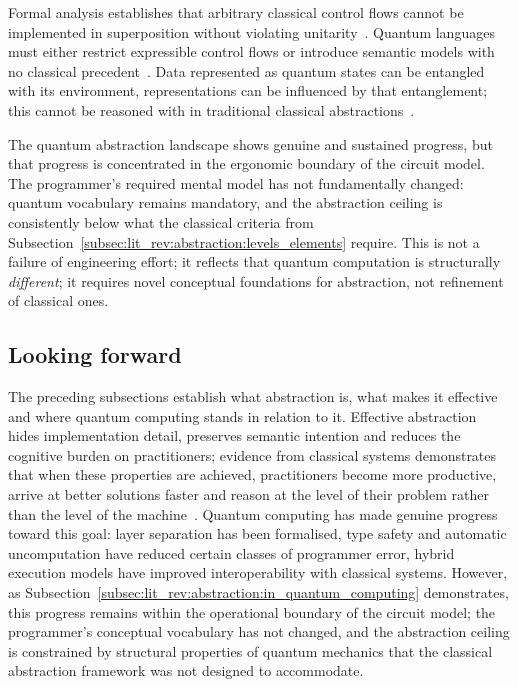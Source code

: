 Formal analysis establishes that arbitrary classical control flows cannot be implemented in superposition without violating unitarity~\cite{yuan2025foundationalabstractions}.
Quantum languages must either restrict expressible control flows or introduce semantic models with no classical precedent~\cite{yuan2025foundationalabstractions}.
Data represented as quantum states can be entangled with its environment, representations can be influenced by that entanglement; this cannot be reasoned with in traditional classical abstractions~\cite{yuan2025foundationalabstractions}.

The quantum abstraction landscape shows genuine and sustained progress, but that progress is concentrated in the ergonomic boundary of the circuit model.
The programmer's required mental model has not fundamentally changed: quantum vocabulary remains mandatory, and the abstraction ceiling is consistently below what the classical criteria from Subsection~\ref{subsec:lit_rev:abstraction:levels_elements} require.
This is not a failure of engineering effort; it reflects that quantum computation is structurally \textit{different}; it requires novel conceptual foundations for abstraction, not refinement of classical ones.

\subsection{Looking forward}\label{subsec:lit_rev:abstraction:looking_forward}
The preceding subsections establish what abstraction is, what makes it effective and where quantum computing stands in relation to it.
Effective abstraction hides implementation detail, preserves semantic intention and reduces the cognitive burden on practitioners; evidence from classical systems demonstrates that when these properties are achieved, practitioners become more productive, arrive at better solutions faster and reason at the level of their problem rather than the level of the machine~\cite{Prechelt2000EmpiricalComparison,IpeirotisZheng2025NLIDBUsers}.
Quantum computing has made genuine progress toward this goal: layer separation has been formalised, type safety and automatic uncomputation have reduced certain classes of programmer error, hybrid execution models have improved interoperability with classical systems.
However, as Subsection~\ref{subsec:lit_rev:abstraction:in_quantum_computing} demonstrates, this progress remains within the operational boundary of the circuit model; the programmer's conceptual vocabulary has not changed, and the abstraction ceiling is constrained by structural properties of quantum mechanics that the classical abstraction framework was not designed to accommodate.

